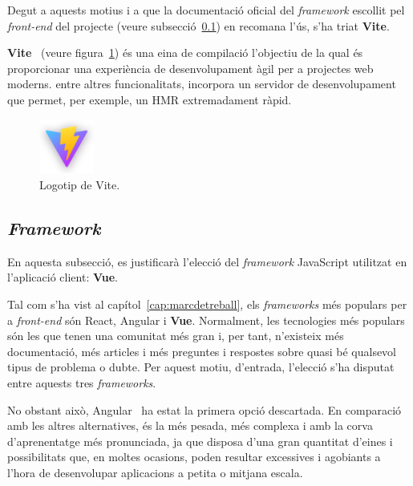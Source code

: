 \documentclass[a4paper,12pt]{ThesisStyle}
\begin{document}
Degut a aquests motius i a que la documentació oficial del \textit{framework} escollit pel \textit{front-end} del projecte (veure subsecció~\ref{subsec:decisions_client_framework}) en recomana l'ús, s'ha triat \textbf{Vite}.

\textbf{Vite}~\cite{Vite} (veure figura~\ref{img:logo_vite}) és una eina de compilació l'objectiu de la qual és proporcionar una experiència de desenvolupament àgil per a projectes web moderns. entre altres funcionalitats, incorpora un servidor de desenvolupament que permet, per exemple, un HMR extremadament ràpid.

\begin{figure}[H]
  \centering
  \includegraphics[width=0.16\textwidth]{assets/logos/Vite.png}
  \caption{\label{img:logo_vite}Logotip de Vite.}
\end{figure}

\subsection{\textit{Framework}}
\label{subsec:decisions_client_framework}

En aquesta subsecció, es justificarà l'elecció del \textit{framework} JavaScript utilitzat en l'aplicació client: \textbf{Vue}.

Tal com s'ha vist al capítol~\ref{cap:marcdetreball}, els \textit{frameworks} més populars per a \textit{front-end} són React, Angular i \textbf{Vue}. Normalment, les tecnologies més populars són les que tenen una comunitat més gran i, per tant, n'existeix més documentació, més articles i més preguntes i respostes sobre quasi bé qualsevol tipus de problema o dubte. Per aquest motiu, d'entrada, l'elecció s'ha disputat entre aquests tres \textit{frameworks}.

No obstant això, Angular~\cite{Angular} ha estat la primera opció descartada. En comparació amb les altres alternatives, és la més pesada, més complexa i amb la corva d'aprenentatge més pronunciada, ja que disposa d'una gran quantitat d'eines i possibilitats que, en moltes ocasions, poden resultar excessives i agobiants a l'hora de desenvolupar aplicacions a petita o mitjana escala.
\end{document}

